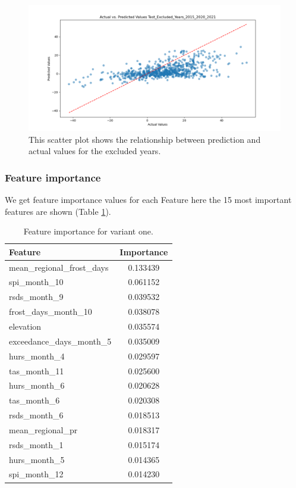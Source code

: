 \documentclass{article}
\begin{document}
\begin{figure}[H]
	\centering
	\includegraphics[width=1.0\textwidth]{./plots/scatter_Test_Excluded_Years_2015_2020_2021.png}
	\caption{\label{fig:month_value_combination_scatter_excluded_years}This scatter plot shows the relationship between prediction and actual values for the excluded years.}
\end{figure}

\subsubsection{Feature importance}
We get feature importance values for each Feature here the 15 most important features are shown (Table \ref{table:feature_importance_variant_1}).
\begin{table}[H]
	\centering
	\begin{tabular}{lc}
		\hline
		Feature                     & Importance \\
		\hline
		mean\_regional\_frost\_days & 0.133439   \\
		spi\_month\_10              & 0.061152   \\
		rsds\_month\_9              & 0.039532   \\
		frost\_days\_month\_10      & 0.038078   \\
		elevation                   & 0.035574   \\
		exceedance\_days\_month\_5  & 0.035009   \\
		hurs\_month\_4              & 0.029597   \\
		tas\_month\_11              & 0.025600   \\
		hurs\_month\_6              & 0.020628   \\
		tas\_month\_6               & 0.020308   \\
		rsds\_month\_6              & 0.018513   \\
		mean\_regional\_pr          & 0.018317   \\
		rsds\_month\_1              & 0.015174   \\
		hurs\_month\_5              & 0.014365   \\
		spi\_month\_12              & 0.014230   \\
		\hline
	\end{tabular}
	\caption{\label{table:feature_importance_variant_1} Feature importance for variant one.}
\end{table}
\end{document}

